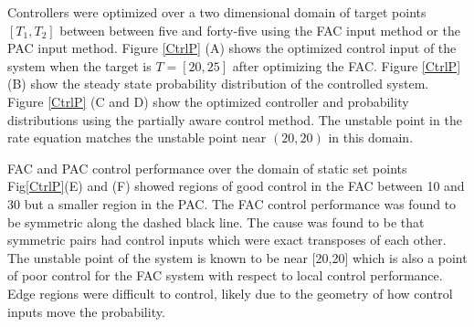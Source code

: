 \documentclass[12pt]{article}
\begin{document}
Controllers were optimized over a two dimensional domain of target points $[T_1,T_2]$ between between five and forty-five using the FAC input method or the PAC input method. Figure \ref{CtrlP} (A) shows the optimized control input of the system when the target is $T=[20,25]$ after optimizing the FAC. Figure \ref{CtrlP} (B) show the steady state probability distribution of the controlled system.  Figure \ref{CtrlP} (C and D) show the optimized controller and probability distributions using the partially aware control method. The unstable point in the rate equation matches the unstable point near $(20,20)$ in this domain.

FAC and PAC control performance over the domain of static set points Fig\ref{CtrlP}(E) and (F) showed regions of good control in the FAC between 10 and 30 but a smaller region in the PAC. The FAC control performance was found to be symmetric along the dashed black line. The cause was found to be that symmetric pairs had control inputs which were exact transposes of each other. The unstable point of the system is known to be near [20,20] which is also a point of poor control for the FAC system with respect to local control performance. Edge regions were difficult to control, likely due to the geometry of how control inputs move the probability.
\end{document}
